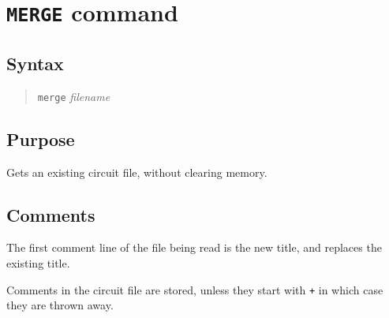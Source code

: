 %
%
%
%
\section{{\tt MERGE} command}
\subsection{Syntax}
\begin{verse}
{\tt merge} {\it filename}
\end{verse}
\subsection{Purpose}

Gets an existing circuit file, without clearing memory.
\subsection{Comments}

The first comment line of the file being read is the new title, and replaces
the existing title.

Comments in the circuit file are stored, unless they start with {\tt *+} in
which case they are thrown away.


